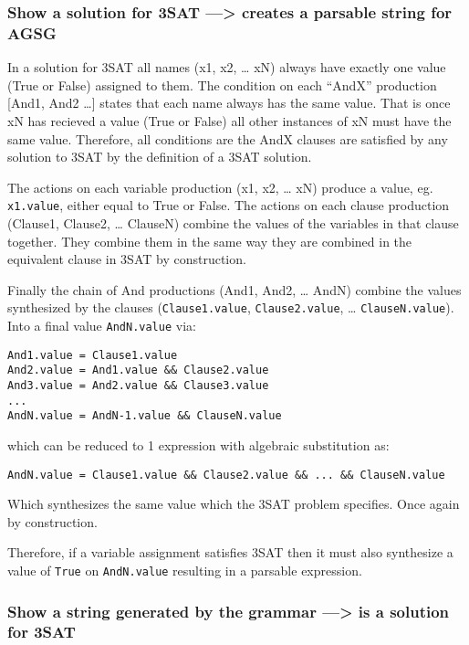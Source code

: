 \subsubsection{Show a solution for 3SAT ---\textgreater{} creates a
parsable string for AGSG}

In a solution for 3SAT all names (x1, x2, \ldots{} xN) always have
exactly one value (True or False) assigned to them. The condition on
each ``AndX'' production {[}And1, And2 \ldots{}{]} states that each name
always has the same value. That is once xN has recieved a value (True or
False) all other instances of xN must have the same value. Therefore,
all conditions are the AndX clauses are satisfied by any solution to
3SAT by the definition of a 3SAT solution.

The actions on each variable production (x1, x2, \ldots{} xN) produce a
value, eg. \verb!x1.value!, either equal to True or False. The actions
on each clause production (Clause1, Clause2, \ldots{} ClauseN) combine
the values of the variables in that clause together. They combine them
in the same way they are combined in the equivalent clause in 3SAT by
construction.

Finally the chain of And productions (And1, And2, \ldots{} AndN) combine
the values synthesized by the clauses (\verb!Clause1.value!,
\verb!Clause2.value!, \ldots{} \verb!ClauseN.value!). Into a final value
\verb!AndN.value! via:

\begin{verbatim}
And1.value = Clause1.value
And2.value = And1.value && Clause2.value
And3.value = And2.value && Clause3.value
...
AndN.value = AndN-1.value && ClauseN.value
\end{verbatim}
which can be reduced to 1 expression with algebraic substitution as:

\begin{verbatim}
AndN.value = Clause1.value && Clause2.value && ... && ClauseN.value
\end{verbatim}
Which synthesizes the same value which the 3SAT problem specifies. Once
again by construction.

Therefore, if a variable assignment satisfies 3SAT then it must also
synthesize a value of \verb!True! on \verb!AndN.value! resulting in a
parsable expression.

\subsubsection{Show a string generated by the grammar ---\textgreater{}
is a solution for 3SAT}

